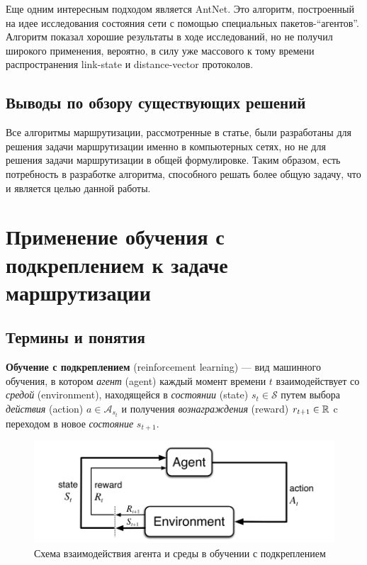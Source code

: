 \documentclass[specification, annotation]{itmo-student-thesis}
\begin{document}
Еще одним интересным подходом является AntNet\cite{di1998antnet}. Это алгоритм,
построенный на идее исследования состояния сети с помощью специальных
пакетов-``агентов''. Алгоритм показал хорошие результаты в ходе исследований, но
не получил широкого применения, вероятно, в силу уже массового к тому времени
распространения link-state и distance-vector протоколов.

\subsection{Выводы по обзору существующих решений}

Все алгоритмы маршрутизации, рассмотренные в статье, были разработаны для
решения задачи маршрутизации именно в компьютерных сетях, но не для решения
задачи маршрутизации в общей формулировке. Таким образом, есть потребность в
разработке алгоритма, способного решать более общую задачу, что и является целью
данной работы.

\section{Применение обучения с подкреплением к задаче маршрутизации}

\subsection{Термины и понятия}

\textbf{Обучение с подкреплением} (reinforcement learning) --- вид машинного
обучения, в котором \textit{агент} (agent) каждый момент времени $t$
взаимодействует со \textit{средой} (environment), находящейся в
\textit{состоянии} (state) $s_t \in \mathcal{S}$ путем выбора
\textit{действия} (action) $a \in \mathcal{A}_{s_t}$ и получения
\textit{вознаграждения} (reward) $r_{t+1} \in \Bbb{R}$ c переходом в новое
\textit{состояние} $s_{t+1}$.

\begin{figure}[!h]
  \caption{Схема взаимодействия агента и среды в обучении с подкреплением}\label{rl-scheme}
  \centering
  \includegraphics[scale=0.5]{rl-scheme}
\end{figure}
\end{document}
